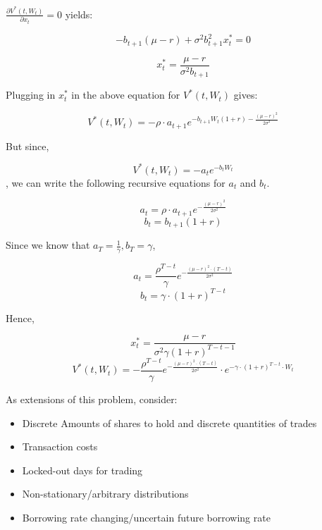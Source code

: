 \documentclass[12pt]{amsart}
\begin{document}
$\frac {\partial V^*(t, W_t)} {\partial x_t} = 0$ yields:

$$-b_{t+1} (\mu - r) + \sigma^2 b_{t+1}^2 x^*_t = 0$$

$$x^*_t = \frac {\mu - r} {\sigma^2 b_{t+1}}$$

Plugging in $x^*_t$ in the above equation for $V^*(t, W_t)$ gives:

$$V^*(t, W_t) = - \rho \cdot a_{t+1} e^{-b_{t+1} W_t (1 + r) - \frac {(\mu - r)^2} {2 \sigma^2}} $$

But since,

$$V^*(t, W_t) = -a_t e^{-b_t W_t}$$, we can write the following recursive equations for $a_t$ and $b_t$.

$$a_t = \rho \cdot a_{t+1} e^{- \frac {(\mu -r)^2} {2 \sigma^2}}$$
$$b_t = b_{t+1} (1 + r)$$

Since we know that $a_T = \frac 1 \gamma, b_T = \gamma$,

$$a_t = \frac {\rho^{T-t}} {\gamma} e^{- \frac {(\mu - r)^2 \cdot (T-t)} {2 \sigma^2}}$$
$$b_t = \gamma \cdot (1+ r)^{T-t}$$

Hence,

$$x^*_t = \frac {\mu - r} {\sigma^2 \gamma (1+ r)^{T-t-1}}$$
$$V^*(t, W_t) = - \frac {\rho^{T-t}} {\gamma} e^{- \frac {(\mu - r)^2 \cdot (T-t)} {2 \sigma^2}} \cdot e^{- \gamma \cdot (1+ r)^{T-t} \cdot W_t}$$

As extensions of this problem, consider:

\begin{itemize}
\item Discrete Amounts of shares to hold and discrete quantities of trades
\item Transaction costs
\item Locked-out days for trading
\item Non-stationary/arbitrary distributions
\item Borrowing rate changing/uncertain future borrowing rate
\end{itemize}
\end{document}
